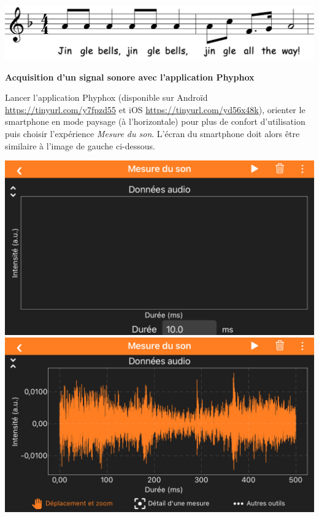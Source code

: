 \documentclass[12pt,a4paper]{article}
\begin{document}
\vfill

\begin{center}
\includegraphics[scale=0.35]{images/jingle_bells.png}
\end{center}


\begin{doc}
\label{doc:phyphox}
\textbf{Acquisition d'un signal sonore avec l'application Phyphox}

Lancer l'application Phyphox (disponible sur Androïd \href{https://play.google.com/store/apps/details?id=de.rwth_aachen.phyphox&hl=fr&gl=US}{https://tinyurl.com/y7fpzd55} et iOS \href{https://apps.apple.com/fr/app/phyphox/id1127319693#?platform=iphone}{https://tinyurl.com/yd56x48k}), orienter le smartphone en mode paysage (à l'horizontale) pour plus de confort d'utilisation puis choisir l'expérience \emph{Mesure du son}.
L'écran du smartphone doit alors être similaire à l'image de gauche ci-dessous.

\begin{center}
\includegraphics[scale=0.2]{images/phyphox1.jpeg}
\includegraphics[scale=0.2]{images/phyphox2.jpeg}
\end{center}


\end{doc}
\end{document}
